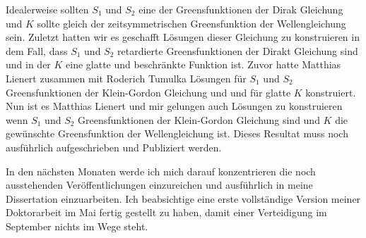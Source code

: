 \documentclass[a4paper,12pt]{article}
\begin{document}
Idealerweise sollten \(S_1\) und \(S_2\) eine der Greensfunktionen der Dirak Gleichung  und \(K\) sollte gleich der zeitsymmetrischen Greensfunktion
der Wellengleichung sein. Zuletzt hatten wir es geschafft Lösungen dieser Gleichung zu konstruieren in dem Fall, dass \(S_1\) und \(S_2\) 
retardierte Greensfunktionen der Dirakt Gleichung sind und in der \(K\) eine glatte und beschränkte Funktion ist. Zuvor hatte Matthias Lienert zusammen
mit Roderich Tumulka Lösungen für \(S_1\) und \(S_2\) Greensfunktionen der Klein-Gordon Gleichung und und für glatte \(K\) konstruiert.
Nun ist es Matthias Lienert und mir gelungen auch Lösungen zu konstruieren wenn \(S_1\) und \(S_2\) Greensfunktionen der Klein-Gordon Gleichung 
sind und \(K\) die gewünschte Greensfunktion der Wellengleichung ist. Dieses Resultat muss noch ausführlich aufgeschrieben und Publiziert werden.

In den nächsten Monaten werde ich mich darauf konzentrieren die noch ausstehenden Veröffentlichungen einzureichen und ausführlich in meine Dissertation 
einzuarbeiten. Ich beabsichtige eine erste vollständige Version meiner Doktorarbeit im Mai fertig gestellt zu haben, damit 
einer Verteidigung im September nichts im Wege steht.
\end{document}
